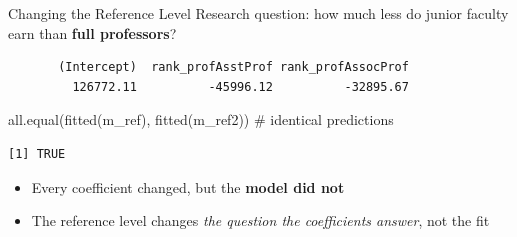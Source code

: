 \documentclass[
  ignorenonframetext,
  aspectratio=169,
]{beamer}
\newenvironment{Shaded}{\begin{snugshade}}{\end{snugshade}}
\newcommand{\AttributeTok}[1]{\textcolor[rgb]{0.40,0.45,0.13}{#1}}
\newcommand{\CommentTok}[1]{\textcolor[rgb]{0.37,0.37,0.37}{#1}}
\newcommand{\FunctionTok}[1]{\textcolor[rgb]{0.28,0.35,0.67}{#1}}
\newcommand{\NormalTok}[1]{\textcolor[rgb]{0.00,0.23,0.31}{#1}}
\newcommand{\OtherTok}[1]{\textcolor[rgb]{0.00,0.23,0.31}{#1}}
\newcommand{\SpecialCharTok}[1]{\textcolor[rgb]{0.37,0.37,0.37}{#1}}
\newcommand{\StringTok}[1]{\textcolor[rgb]{0.13,0.47,0.30}{#1}}
\providecommand{\tightlist}{%
  \setlength{\itemsep}{0pt}\setlength{\parskip}{0pt}}\usepackage{longtable,booktabs,array}
\begin{document}
\begin{frame}[fragile]{Changing the Reference Level}
\protect\hypertarget{changing-the-reference-level}{}
Research question: how much less do junior faculty earn than
\textbf{full professors}?

\begin{Shaded}
\end{Shaded}

\begingroup\tiny\color{darkgray}

\begin{verbatim}
       (Intercept)  rank_profAsstProf rank_profAssocProf 
         126772.11          -45996.12          -32895.67 
\end{verbatim}

\endgroup

\begin{Shaded}
\begin{Highlighting}[]
\FunctionTok{all.equal}\NormalTok{(}\FunctionTok{fitted}\NormalTok{(m\_ref), }\FunctionTok{fitted}\NormalTok{(m\_ref2))   }\CommentTok{\# identical predictions}
\end{Highlighting}
\end{Shaded}

\begingroup\tiny\color{darkgray}

\begin{verbatim}
[1] TRUE
\end{verbatim}

\endgroup

\begin{itemize}
\tightlist
\item
  Every coefficient changed, but the \textbf{model did not}
\item
  The reference level changes \emph{the question the coefficients
  answer}, not the fit
\end{itemize}
\end{frame}
\end{document}
